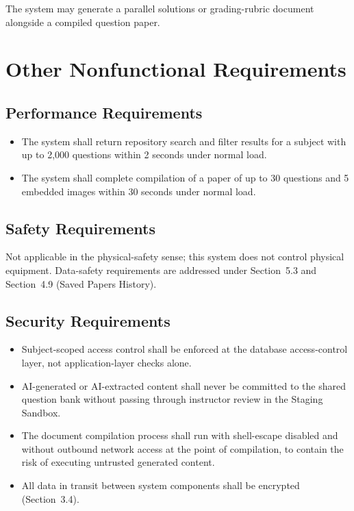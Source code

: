 \documentclass[11pt]{article}
\newcommand{\reqid}[1]{\textbf{#1}}
\begin{document}
\begin{description}[nosep,leftmargin=2.2cm]
  \item[\reqid{REQ-16.1}] The system may generate a parallel solutions or
    grading-rubric document alongside a compiled question paper.
\end{description}

\section{Other Nonfunctional Requirements}

\subsection{Performance Requirements}
\begin{itemize}[nosep]
  \item The system shall return repository search and filter results for
    a subject with up to 2,000 questions within 2 seconds under normal
    load.
  \item The system shall complete compilation of a paper of up to 30
    questions and 5 embedded images within 30 seconds under normal load.
\end{itemize}

\subsection{Safety Requirements}
Not applicable in the physical-safety sense; this system does not control
physical equipment. Data-safety requirements are addressed under
Section~5.3 and Section~4.9 (Saved Papers History).

\subsection{Security Requirements}
\begin{itemize}[nosep]
  \item Subject-scoped access control shall be enforced at the database
    access-control layer, not application-layer checks alone.
  \item AI-generated or AI-extracted content shall never be committed to
    the shared question bank without passing through instructor review in
    the Staging Sandbox.
  \item The document compilation process shall run with shell-escape
    disabled and without outbound network access at the point of
    compilation, to contain the risk of executing untrusted generated
    content.
  \item All data in transit between system components shall be encrypted
    (Section~3.4).
\end{itemize}
\end{document}
